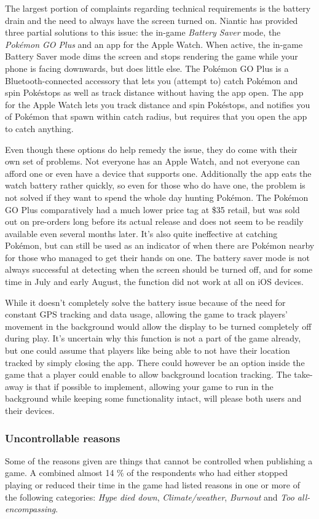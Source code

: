 The largest portion of complaints regarding technical requirements is the battery drain and the need to always have the screen turned on. Niantic has provided three partial solutions to this issue: the in-game \emph{Battery Saver} mode, the \emph{Pokémon GO Plus} and an app for the Apple Watch. When active, the in-game Battery Saver mode dims the screen and stops rendering the game while your phone is facing downwards, but does little else. The Pokémon GO Plus is a Bluetooth-connected accessory that lets you (attempt to) catch Pokémon and spin Pokéstops as well as track distance without having the app open. The app for the Apple Watch lets you track distance and spin Pokéstops, and notifies you of Pokémon that spawn within catch radius, but requires that you open the app to catch anything.

Even though these options do help remedy the issue, they do come with their own set of problems. Not everyone has an Apple Watch, and not everyone can afford one or even have a device that supports one. Additionally the app eats the watch battery rather quickly, so even for those who do have one, the problem is not solved if they want to spend the whole day hunting Pokémon. The Pokémon GO Plus comparatively had a much lower price tag at \$35 retail, but was sold out on pre-orders long before its actual release and does not seem to be readily available even several months later. It's also quite ineffective at catching Pokémon, but can still be used as an indicator of when there are Pokémon nearby for those who managed to get their hands on one. The battery saver mode is not always successful at detecting when the screen should be turned off, and for some time in July and early August, the function did not work at all on iOS devices.

While it doesn't completely solve the battery issue because of the need for constant GPS tracking and data usage, allowing the game to track players' movement in the background would allow the display to be turned completely off during play. It's uncertain why this function is not a part of the game already, but one could assume that players like being able to not have their location tracked by simply closing the app. There could however be an option inside the game that a player could enable to allow background location tracking. The take-away is that if possible to implement, allowing your game to run in the background while keeping some functionality intact, will please both users and their devices.

\subsubsection{Uncontrollable reasons}
Some of the reasons given are things that cannot be controlled when publishing a game. A combined almost 14 \% of the respondents who had either stopped playing or reduced their time in the game had listed reasons in one or more of the following categories: \emph{Hype died down}, \emph{Climate/weather}, \emph{Burnout} and \emph{Too all-encompassing}.

